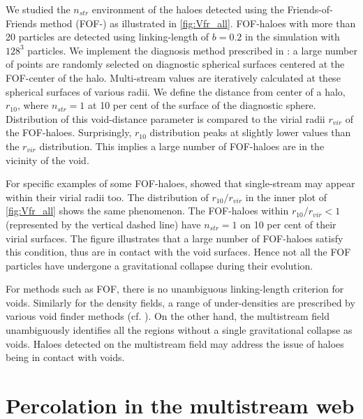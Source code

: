 We studied the $n_{str}$ environment of the haloes detected using the Friends-of-Friends method (FOF-\citealt{Davis1985}) as illustrated in \autoref{fig:Vfr_all}. FOF-haloes with more than 20 particles are detected using linking-length of $b=0.2$ in the simulation with $128^3$ particles. We implement the diagnosis method prescribed in \cite{Ramachandra2015}: a large number of points are randomly selected on diagnostic spherical surfaces centered at the FOF-center of the halo. Multi-stream values are iteratively calculated at these spherical surfaces of various radii. We define the distance from center of a halo, $r_{10}$, where $n_{str} = 1$ at 10 per cent of the surface of the diagnostic sphere. Distribution of this void-distance parameter is compared to the virial radii $r_{vir}$ of the FOF-haloes. Surprisingly, $r_{10}$ distribution peaks at slightly lower values than the $r_{vir}$ distribution. This implies a large number of FOF-haloes are in the vicinity of the void. 

For specific examples of some FOF-haloes, \cite{Ramachandra2015} showed that single-stream may appear within their virial radii too. The distribution of $r_{10}/r_{vir}$ in the inner plot of \autoref{fig:Vfr_all} shows the same phenomenon. The FOF-haloes within $r_{10}/r_{vir} < 1$ (represented by the vertical dashed line) have $n_{str} = 1$ on 10 per cent of their virial surfaces. The figure illustrates that a large number of FOF-haloes satisfy this condition, thus are in contact with the void surfaces. Hence not all the FOF particles have undergone a gravitational collapse during their evolution. 


For methods such as FOF, there is no unambiguous linking-length criterion for voids. Similarly for the density fields, a range of under-densities are prescribed by various void finder methods (cf. \citealt{Colberg2008}). On the other hand, the multistream field unambiguously identifies all the regions without a single gravitational collapse as voids. Haloes detected on the multistream field may address the issue of haloes being in contact with voids. 

\section{Percolation in the multistream web}
\label{sec:percolation}

